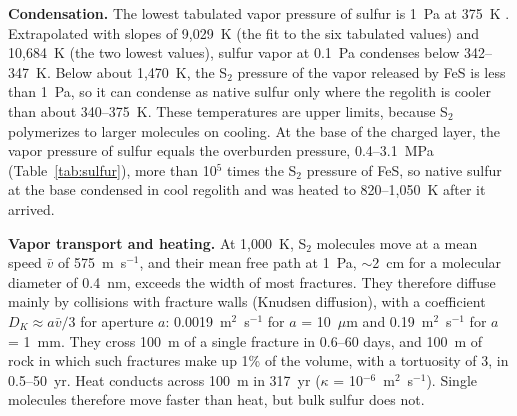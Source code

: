 \documentclass{planetary}
\begin{document}
\textbf{Condensation.} The lowest tabulated vapor pressure of sulfur is 1~Pa at 375~K \parencite{lide2007}. Extrapolated with slopes of 9,029~K (the fit to the six tabulated values) and 10,684~K (the two lowest values), sulfur vapor at 0.1~Pa condenses below 342--347~K. Below about 1,470~K, the S$_2$ pressure of the vapor released by FeS is less than 1~Pa, so it can condense as native sulfur only where the regolith is cooler than about 340--375~K. These temperatures are upper limits, because S$_2$ polymerizes to larger molecules on cooling. At the base of the charged layer, the vapor pressure of sulfur equals the overburden pressure, 0.4--3.1~MPa (Table~\ref{tab:sulfur}), more than 10$^5$ times the S$_2$ pressure of FeS, so native sulfur at the base condensed in cool regolith and was heated to 820--1,050~K after it arrived.

\textbf{Vapor transport and heating.} At 1,000~K, S$_2$ molecules move at a mean speed $\bar{v}$ of 575~m~s$^{-1}$, and their mean free path at 1~Pa, $\sim$2~cm for a molecular diameter of 0.4~nm, exceeds the width of most fractures. They therefore diffuse mainly by collisions with fracture walls (Knudsen diffusion), with a coefficient $D_K \approx a\bar{v}/3$ for aperture $a$: 0.0019~m$^2$~s$^{-1}$ for $a$ = 10~$\mu$m and 0.19~m$^2$~s$^{-1}$ for $a$ = 1~mm. They cross 100~m of a single fracture in 0.6--60 days, and 100~m of rock in which such fractures make up 1\% of the volume, with a tortuosity of 3, in 0.5--50~yr. Heat conducts across 100~m in 317~yr ($\kappa$ = 10$^{-6}$~m$^2$~s$^{-1}$). Single molecules therefore move faster than heat, but bulk sulfur does not.
\end{document}
